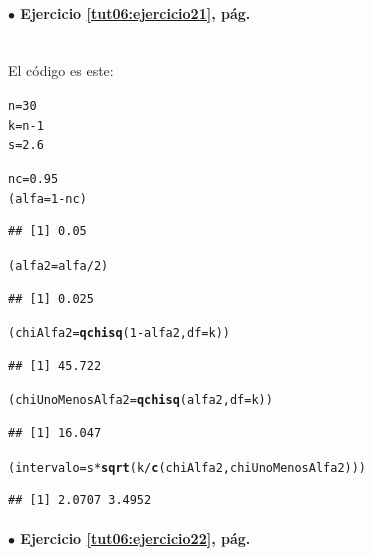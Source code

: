 \documentclass[10pt,a4paper]{article}\usepackage[]{graphicx}\usepackage[]{color}
\makeatletter
\newcommand{\hlnum}[1]{\textcolor[rgb]{0.686,0.059,0.569}{#1}}%
\newcommand{\hlopt}[1]{\textcolor[rgb]{0,0,0}{#1}}%
\newcommand{\hlstd}[1]{\textcolor[rgb]{0.345,0.345,0.345}{#1}}%
\newcommand{\hlkwb}[1]{\textcolor[rgb]{0.69,0.353,0.396}{#1}}%
\newcommand{\hlkwc}[1]{\textcolor[rgb]{0.333,0.667,0.333}{#1}}%
\newcommand{\hlkwd}[1]{\textcolor[rgb]{0.737,0.353,0.396}{\textbf{#1}}}%
\newenvironment{kframe}{%
 \def\at@end@of@kframe{}%
 \ifinner\ifhmode%
  \def\at@end@of@kframe{\end{minipage}}%
  \begin{minipage}{\columnwidth}%
 \fi\fi%
 \def\FrameCommand##1{\hskip\@totalleftmargin \hskip-\fboxsep
 \colorbox{shadecolor}{##1}\hskip-\fboxsep
     \hskip-\linewidth \hskip-\@totalleftmargin \hskip\columnwidth}%
 \MakeFramed {\advance\hsize-\width
   \@totalleftmargin\z@ \linewidth\hsize
   \@setminipage}}%
 {\par\unskip\endMakeFramed%
 \at@end@of@kframe}
\newenvironment{knitrout}{}{} %
\makeatother
\begin{document}
\paragraph{\bf $\bullet$ Ejercicio \ref{tut06:ejercicio21}, pág. \pageref{tut06:ejercicio21}}
\label{tut06:ejercicio21:sol}\quad\\

El código es este:
\begin{knitrout}
\color{fgcolor}\begin{kframe}
\begin{alltt}
\hlstd{n} \hlkwb{=} \hlnum{30}
\hlstd{k} \hlkwb{=} \hlstd{n} \hlopt{-} \hlnum{1}
\hlstd{s} \hlkwb{=} \hlnum{2.6}

\hlstd{nc} \hlkwb{=} \hlnum{0.95}
\hlstd{(alfa} \hlkwb{=} \hlnum{1} \hlopt{-} \hlstd{nc)}
\end{alltt}
\begin{verbatim}
## [1] 0.05
\end{verbatim}
\begin{alltt}
\hlstd{(alfa2} \hlkwb{=} \hlstd{alfa} \hlopt{/}\hlnum{2}\hlstd{)}
\end{alltt}
\begin{verbatim}
## [1] 0.025
\end{verbatim}
\begin{alltt}
\hlstd{(chiAlfa2} \hlkwb{=} \hlkwd{qchisq}\hlstd{(}\hlnum{1} \hlopt{-} \hlstd{alfa2,} \hlkwc{df}\hlstd{=k))}
\end{alltt}
\begin{verbatim}
## [1] 45.722
\end{verbatim}
\begin{alltt}
\hlstd{(chiUnoMenosAlfa2} \hlkwb{=} \hlkwd{qchisq}\hlstd{(alfa2,} \hlkwc{df}\hlstd{=k))}
\end{alltt}
\begin{verbatim}
## [1] 16.047
\end{verbatim}
\begin{alltt}
\hlstd{(intervalo} \hlkwb{=} \hlstd{s} \hlopt{*} \hlkwd{sqrt}\hlstd{(k} \hlopt{/} \hlkwd{c}\hlstd{(chiAlfa2, chiUnoMenosAlfa2)))}
\end{alltt}
\begin{verbatim}
## [1] 2.0707 3.4952
\end{verbatim}
\end{kframe}
\end{knitrout}

\paragraph{\bf $\bullet$ Ejercicio \ref{tut06:ejercicio22}, pág. \pageref{tut06:ejercicio22}}
\label{tut06:ejercicio22:sol}\quad\\
\end{document}
